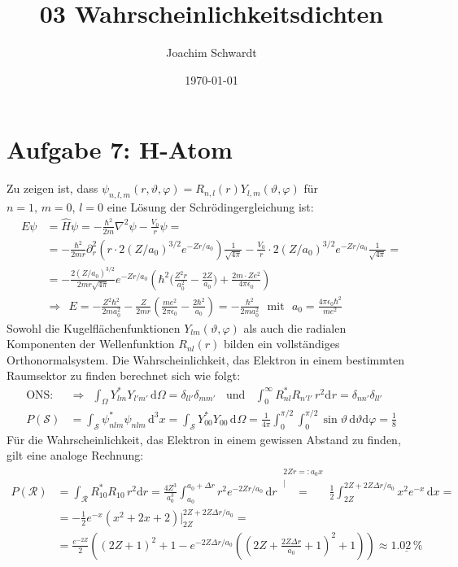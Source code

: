 \documentclass[a4paper,12pt]{article}
\newcommand{\kom}{}
\newcommand{\intx}{}
\newcommand{\kla}{}
\begin{document}
\title{03 Wahrscheinlichkeitsdichten}
\author{Joachim Schwardt}
\date{\today}
\maketitle

\section*{Aufgabe 7: H-Atom}
Zu zeigen ist, dass $\psi_{n,l,m}(r,\vartheta ,\varphi )=R_{n,l}(r)Y_{l,m}(\vartheta, \varphi)$ für $n=1,\, m=0,\, l=0$ eine Lösung der Schrödingergleichung ist:
\begin{align*}
E\psi &=\hat{H}\psi =-\frac{\hbar^2}{2m}\nabla^2\psi -\frac{V_0}{r}\psi=\\
&=-\frac{\hbar^2}{2mr}\partial_r^2\kla\left( {r\cdot 2(Z/a_0)^{3/2}e^{-Zr/a_0}} \right) \frac{1}{\sqrt{4\pi}}-\frac{V_0}{r}\cdot 2(Z/a_0)^{3/2}e^{-Zr/a_0}\frac{1}{\sqrt{4\pi}}=\\
&=-\frac{{2(Z/a_0)}^{3/2}}{2mr\sqrt{4\pi}}e^{-Zr/a_0}\kla\left( {\hbar^2\Big(\frac{Z^2r}{a_0^2}-\frac{2Z}{a_0}\Big)+\frac{2m\cdot Ze^2}{4\pi\epsilon_0}} \right)  \\
&\Rightarrow\ \ E=-\frac{Z^2\hbar^2}{2ma_0^2}-\frac{Z}{2mr}\kla\left( {\frac{me^2}{2\pi\epsilon_0}-\frac{2\hbar^2}{a_0}} \right)  =-\frac{\hbar^2}{2ma_0^2}\ \ \ \mathrm{mit }\ \ \ a_0=\frac{4\pi\epsilon_0\hbar^2}{me^2}
\end{align*}
Sowohl die Kugelflächenfunktionen $Y_{lm}(\vartheta,\varphi)$ als auch die radialen Komponenten der Wellenfunktion $R_{nl}(r)$ bilden ein vollständiges Orthonormalsystem. Die Wahrscheinlichkeit, das Elektron in einem bestimmten Raumsektor zu finden berechnet sich wie folgt:
\begin{align*}
\mathrm{ONS}:\ &\Rightarrow\ \ \int_\Omega Y_{lm}^\ast Y_{l'm'}\,\mathrm{d}\Omega = \delta_{ll'}\delta_{mm'}\ \ \ \ \mathrm{und }\ \ \ \ \intx\int_{0}^\infty {R_{nl}^\ast R_{n'l'}\, r^2}\mathrm{d}^{ }r=\delta_{nn'}\delta_{ll'}\\
P(\mathcal{S})&=\intx\int_{\mathcal{S}}{\psi_{nlm}^\ast \psi_{nlm}}\,\mathrm{d}^{3}x=\intx\int_{\mathcal{S}}{Y_{00}^\ast Y_{00}}\,\mathrm{d}^{ }\Omega =\frac{1}{4\pi}\int_0^{\pi /2}\int_0^{\pi /2}\sin\vartheta\,\mathrm{d}\vartheta\mathrm{d}\varphi = \frac{1}{8}
\end{align*}
Für die Wahrscheinlichkeit, das Elektron in einem gewissen Abstand zu finden, gilt eine analoge Rechnung:
\begin{align*}
P(\mathcal{R})&=\int_\mathcal{R}R_{10}^\ast R_{10}\,r^2\mathrm{d}r=\frac{4Z^3}{a_0^3}\int_{a_0}^{a_0+\Delta r} r^2e^{-2Zr/a_0}\,\mathrm{d}r\kom\overset{\substack{{2Zr=:a_0x} \\ |}}{=}\frac{1}{2}\int_{2Z}^{2Z+2Z\Delta r/a_0}x^2e^{-x}\,\mathrm{d}x=\\
&=-\frac{1}{2}e^{-x}\kla\left( {x^2+2x+2} \right)\bigg\vert_{2Z}^{2Z+2Z\Delta r/a_0}=\\
&=\frac{e^{-2Z}}{2}\kla\left( {(2Z+1)^2+1-e^{-2Z\Delta r/a_0}((2Z+\frac{2Z\Delta r}{a_0}+1)^2+1)} \right) \approx \underline{1.02\,\%} 
\end{align*}
\end{document}
